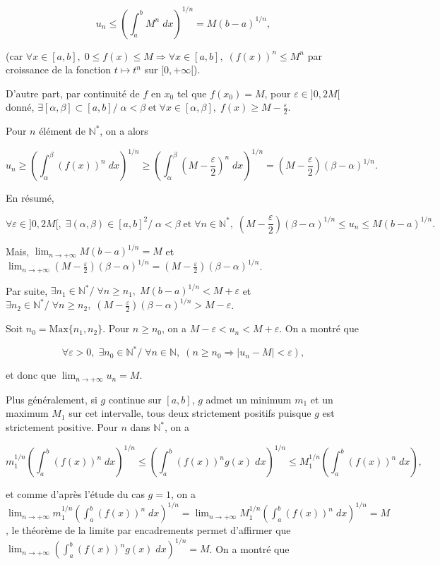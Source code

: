 \documentclass[11pt,a4paper]{article}
\newcommand{\Nn}{\mathbb{N}} \newcommand{\N}{\mathbb{N}}
\begin{document}
$$u_n\leq\left(\int_{a}^{b}M^n\;dx\right)^{1/n}=M(b-a)^{1/n},$$
 
(car $\forall x\in[a,b],\;0\leq f(x)\leq M\Rightarrow \forall x\in[a,b],\;(f(x))^n\leq M^n$ par croissance de la fonction $t\mapsto t^n$ sur $[0,+\infty[$).

D'autre part, par continuité de $f$ en $x_0$ tel que $f(x_0)=M$, pour $\varepsilon\in]0,2M[$ donné, $\exists[\alpha,\beta]\subset[a,b]/\;\alpha<\beta\;\mbox{et}\;\forall x\in[\alpha,\beta],\;f(x)\geq M-\frac{\varepsilon}{2}$.

Pour $n$ élément de $\Nn^*$, on a alors 

$$u_n\geq\left(\int_{\alpha}^{\beta}(f(x))^n\;dx\right)^{1/n}\geq\left(\int_{\alpha}^{\beta}(M-\frac{\varepsilon}{2})^n\;dx\right)^{1/n}=(M-\frac{\varepsilon}{2})(\beta-\alpha)^{1/n}.$$

En résumé,

$$\forall\varepsilon\in]0,2M[,\;\exists(\alpha,\beta)\in[a,b]^2/\;\alpha<\beta\;\mbox{et}\;\forall n\in\Nn^*,\;
(M-\frac{\varepsilon}{2})(\beta-\alpha)^{1/n}\leq u_n\leq M(b-a)^{1/n}.$$

Mais, $\lim_{n\rightarrow +\infty}M(b-a)^{1/n}=M$ et $\lim_{n\rightarrow +\infty}(M-\frac{\varepsilon}{2})(\beta-\alpha)^{1/n}=(M-\frac{\varepsilon}{2})(\beta-\alpha)^{1/n}$.

Par suite, $\exists n_1\in\Nn^*/\;\forall n\geq n_1,\;M(b-a)^{1/n}<M+\varepsilon$ et $\exists n_2\in\Nn^*/\;\forall n\geq n_2,\;(M-\frac{\varepsilon}{2})(\beta-\alpha)^{1/n}>M-\varepsilon$.

Soit $n_0=\mbox{Max}\{n_1,n_2\}$. Pour $n\geq n_0$, on a $M-\varepsilon<u_n<M+\varepsilon$. On a montré que 

$$\forall\varepsilon>0,\;\exists n_0\in\Nn^*/\;\forall n\in\Nn,\;(n\geq n_0\Rightarrow|u_n-M|<\varepsilon),$$

et donc que $\lim_{n\rightarrow +\infty}u_n=M$.

Plus généralement, si $g$ continue sur $[a,b]$, $g$ admet un minimum $m_1$ et un maximum $M_1$ sur cet intervalle, tous deux strictement positifs puisque $g$ est strictement positive. Pour $n$ dans $\Nn^*$, on a
 
$$m_1^{1/n}\left(\int_{a}^{b}(f(x))^n\;dx\right)^{1/n}\leq\left(\int_{a}^{b}(f(x))^ng(x)\;dx\right)^{1/n}\leq M_1^{1/n}\left(\int_{a}^{b}(f(x))^n\;dx\right),$$

et comme d'après l'étude du cas $g=1$, on a $\lim_{n\rightarrow +\infty}m_1^{1/n}\left(\int_{a}^{b}(f(x))^n\;dx\right)^{1/n}=\lim_{n\rightarrow +\infty}M_1^{1/n}\left(\int_{a}^{b}(f(x))^n\;dx\right)^{1/n}=M$, le théorème de la limite par encadrements permet d'affirmer que $\lim_{n\rightarrow +\infty}\left(\int_{a}^{b}(f(x))^ng(x)\;dx\right)^{1/n}=M$. On a montré que 
\end{document}
